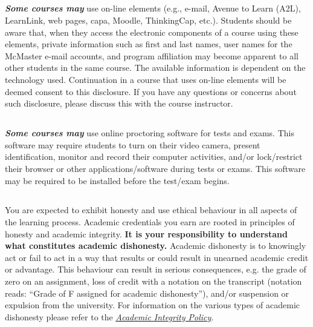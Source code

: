 \documentclass[hidelinks,11pt]{article}
\begin{document}
\subsection*{{}}
\textbf{\emph{Some courses may}} use on-line elements (e.g., e-mail, Avenue to Learn (A2L), LearnLink, web pages, capa, \newline Moodle, ThinkingCap, etc.). Students should be aware that, when they access the electronic components of a course using these elements, private information such as first and last names, user names for the McMaster e-mail accounts, and program affiliation may become apparent to all other students in the same course. The available information is dependent on the technology used. Continuation in a course that uses on-line elements will be deemed consent to this disclosure. If you have any questions or concerns about such disclosure, please discuss this with the course instructor.

\subsection*{{}}
\textbf{\emph{Some courses may}} use online proctoring software for tests and exams. This software may require students to turn on their video camera, present identification, monitor and record their computer activities, and/or lock/restrict their browser or other applications/software during tests or exams. This software may be required to be installed before the test/exam begins.

\subsection*{{}}
You are expected to exhibit honesty and use ethical behaviour in all aspects of the learning process. Academic credentials you earn are rooted in principles of honesty and academic integrity. \newline
\textbf{It is your responsibility to understand what constitutes academic dishonesty.} \newline
Academic dishonesty is to knowingly act or fail to act in a way that results or could result in unearned academic credit or advantage. This behaviour can result in serious consequences, e.g. the grade of zero on an assignment, loss of credit with a notation on the transcript (notation reads: ``Grade of F assigned for academic dishonesty''), and/or suspension or expulsion from the university. For information on the various types of academic dishonesty please refer to the \href{https://secretariat.mcmaster.ca/app/uploads/Academic-Integrity-Policy-1-1.pdf}{\emph{\underline{Academic Integrity Policy}}}.
\end{document}
